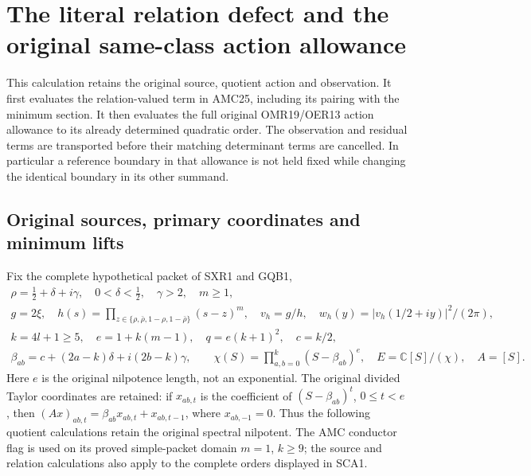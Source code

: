 \section{The literal relation defect and the original same-class action allowance}
\label{sec:SCA}

This calculation retains the original source, quotient action and observation.
It first evaluates the relation-valued term in AMC25, including its pairing
with the minimum section. It then evaluates the full original OMR19/OER13
action allowance to its already determined quadratic order. The observation
and residual terms are transported before their matching determinant terms
are cancelled. In particular a reference boundary in that allowance is not
held fixed while changing the identical boundary in its other summand.

\subsection{Original sources, primary coordinates and minimum lifts}

Fix the complete hypothetical packet of SXR1 and GQB1,
\[
 \begin{gathered}
 \rho=\tfrac12+\delta+i\gamma,
 \quad0<\delta<\tfrac12,\quad\gamma>2,\quad m\ge1,\\
 g=2\xi,\quad
 h(s)=\prod_{z\in\{\rho,\bar\rho,1-\rho,1-\bar\rho\}}(s-z)^m,
 \quad v_h=g/h,\quad
 w_h(y)=|v_h(1/2+iy)|^2/(2\pi),\\
 k=4l+1\ge5,\quad e=1+k(m-1),\quad q=e(k+1)^2,\quad c=k/2,\\
 \beta_{ab}=c+(2a-k)\delta+i(2b-k)\gamma,\qquad
 \chi(S)=\prod_{a,b=0}^k(S-\beta_{ab})^e,
 \quad E=\mathbb C[S]/(\chi),\quad A=[S].
 \end{gathered}\tag{SCA1}
\]
Here $e$ is the original nilpotence length, not an exponential. The original
divided Taylor coordinates are retained: if $x_{ab,t}$ is the coefficient
of $(S-\beta_{ab})^t$, $0\le t<e$, then
$(Ax)_{ab,t}=\beta_{ab}x_{ab,t}+x_{ab,t-1}$, where $x_{ab,-1}=0$.
Thus the following quotient calculations retain the original spectral
nilpotent. The AMC conductor flag is used on its proved simple-packet
domain $m=1$, $k\ge9$; the source and relation calculations also apply to
the complete orders displayed in SCA1.

